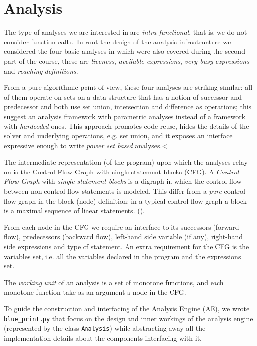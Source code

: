 \section{Analysis}

The type of analyses we are interested in are \emph{intra-functional}, that is, we do not consider function calls. To root the design of the analysis infrastructure
we considered the four basic analyses in \cite{spa} which were also covered during the second part of the course, these are \emph{liveness}, \emph{available expressions},
\emph{very busy expressions} and \emph{reaching definitions}. 

\newpar From a pure algorithmic point of view, these four analyses are striking similar: all of them operate on sets on a data structure that has a notion of successor and predecessor 
and both use set union, intersection and difference as operations; this suggest an analysis framework with parametric analyses instead of a framework with \emph{hardcoded}
ones. This approach promotes code reuse, hides the details of the solver and underlying operations, e.g. set union, and it exposes an interface expressive enough to
write \emph{power set based} analyses.<


\newpar The intermediate representation (of the program) upon which the analyses relay on is the Control Flow Graph with single-statement blocks (CFG). A \emph{Control Flow Graph} with \emph{single-statement blocks} is a digraph in which the control flow between non-control flow statements is modeled. This differ from a \emph{pure} control flow graph in the block (node) definition; in a typical control flow graph a block is a maximal sequence of linear statements. (\cite{cooper}).

\newpar From each node in the CFG we require an interface to its successors (forward flow), predecessors (backward flow), left-hand side variable (if any), right-hand side expressions and type of statement.
An extra requirement for the CFG is the variables set, i.e. all the variables declared in the program and the expressions set.

The \emph{working unit} of an analysis is a set of monotone functions, and each monotone function take as an argument a node in the CFG. 

To guide the construction and interfacing of the Analysis Engine (AE), we wrote \lstinline{blue_print.py} that focus on the design and inner workings of the analysis engine (represented by the class \lstinline{Analysis}) while abstracting away all the implementation details about the components interfacing with it. 

